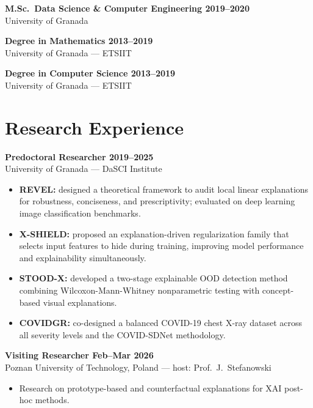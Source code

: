 \documentclass[10pt,a4paper]{article}
\newcommand{\blueitem}[1]{\textcolor{subtitleblue}{\textbf{#1}}}
\newcommand{\sub}[1]{\textcolor{subtle}{\footnotesize #1}}
\begin{document}
\blueitem{M.Sc.~Data Science \& Computer Engineering \hfill 2019--2020} \\
\sub{University of Granada}

\vspace{0.2em}

\blueitem{Degree in Mathematics \hfill 2013--2019} \\
\sub{University of Granada --- ETSIIT}

\vspace{0.2em}

\blueitem{Degree in Computer Science \hfill 2013--2019} \\
\sub{University of Granada --- ETSIIT}

\section*{Research Experience}

\blueitem{Predoctoral Researcher \hfill 2019--2025} \\
\sub{University of Granada --- DaSCI Institute}
\begin{itemize}
    \item \textbf{REVEL:} designed a theoretical framework to audit local linear explanations for robustness, conciseness, and prescriptivity; evaluated on deep learning image classification benchmarks.
    \item \textbf{X-SHIELD:} proposed an explanation-driven regularization family that selects input features to hide during training, improving model performance and explainability simultaneously.
    \item \textbf{STOOD-X:} developed a two-stage explainable OOD detection method combining Wilcoxon-Mann-Whitney nonparametric testing with concept-based visual explanations.
    \item \textbf{COVIDGR:} co-designed a balanced COVID-19 chest X-ray dataset across all severity levels and the COVID-SDNet methodology.
\end{itemize}

\blueitem{Visiting Researcher \hfill Feb--Mar 2026} \\
\sub{Poznan University of Technology, Poland --- host: Prof.~J.~Stefanowski}
\begin{itemize}
    \item Research on prototype-based and counterfactual explanations for XAI post-hoc methods.
\end{itemize}
\end{document}
